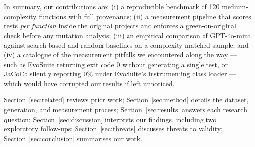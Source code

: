 In summary, our contributions are: (i) a reproducible benchmark of 120 medium-complexity
functions with full provenance; (ii) a measurement pipeline that scores tests \emph{per
function} inside the original projects and enforces a green-on-original check before any
mutation analysis; (iii) an empirical comparison of GPT-4o-mini against search-based and
random baselines on a complexity-matched sample; and (iv) a catalogue of the measurement
pitfalls we encountered along the way --- such as EvoSuite returning exit code 0 without
generating a single test, or JaCoCo silently reporting 0\% under EvoSuite's instrumenting
class loader --- which would have corrupted our results if left unnoticed.

Section~\ref{sec:related} reviews prior work; Section~\ref{sec:method} details the
dataset, generation, and measurement process; Section~\ref{sec:results} answers each
research question; Section~\ref{sec:discussion} interprets our findings, including two
exploratory follow-ups; Section~\ref{sec:threats} discusses threats to validity;
Section~\ref{sec:conclusion} summarises our work.
